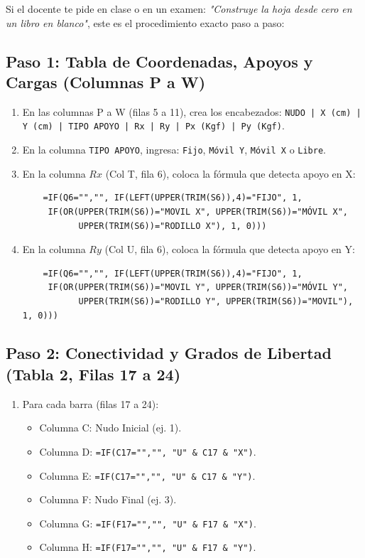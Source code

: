 \documentclass[11pt,a4paper]{article}
\begin{document}
Si el docente te pide en clase o en un examen: \textit{"Construye la hoja desde cero en un libro en blanco"}, este es el procedimiento exacto paso a paso:

\subsection{Paso 1: Tabla de Coordenadas, Apoyos y Cargas (Columnas P a W)}
\begin{enumerate}
    \item En las columnas P a W (filas 5 a 11), crea los encabezados:
    \texttt{NUDO | X (cm) | Y (cm) | TIPO APOYO | Rx | Ry | Px (Kgf) | Py (Kgf)}.
    \item En la columna \texttt{TIPO APOYO}, ingresa: \texttt{Fijo}, \texttt{Móvil Y}, \texttt{Móvil X} o \texttt{Libre}.
    \item En la columna $Rx$ (Col T, fila 6), coloca la fórmula que detecta apoyo en X:
    \begin{verbatim}
    =IF(Q6="","", IF(LEFT(UPPER(TRIM(S6)),4)="FIJO", 1,
     IF(OR(UPPER(TRIM(S6))="MOVIL X", UPPER(TRIM(S6))="MÓVIL X",
           UPPER(TRIM(S6))="RODILLO X"), 1, 0)))
    \end{verbatim}
    \item En la columna $Ry$ (Col U, fila 6), coloca la fórmula que detecta apoyo en Y:
    \begin{verbatim}
    =IF(Q6="","", IF(LEFT(UPPER(TRIM(S6)),4)="FIJO", 1,
     IF(OR(UPPER(TRIM(S6))="MOVIL Y", UPPER(TRIM(S6))="MÓVIL Y",
           UPPER(TRIM(S6))="RODILLO Y", UPPER(TRIM(S6))="MOVIL"), 1, 0)))
    \end{verbatim}
\end{enumerate}

\subsection{Paso 2: Conectividad y Grados de Libertad (Tabla 2, Filas 17 a 24)}
\begin{enumerate}
    \item Para cada barra (filas 17 a 24):
    \begin{itemize}
        \item Columna C: Nudo Inicial (ej. 1).
        \item Columna D: \texttt{=IF(C17="","", "U" \& C17 \& "X")}.
        \item Columna E: \texttt{=IF(C17="","", "U" \& C17 \& "Y")}.
        \item Columna F: Nudo Final (ej. 3).
        \item Columna G: \texttt{=IF(F17="","", "U" \& F17 \& "X")}.
        \item Columna H: \texttt{=IF(F17="","", "U" \& F17 \& "Y")}.
    \end{itemize}
\end{enumerate}
\end{document}
